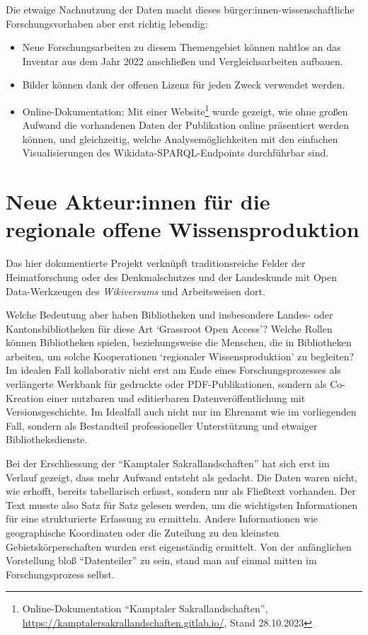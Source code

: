 \documentclass[a4paper,
fontsize=11pt,
oneside,
numbers=noperiodatend,
parskip=half-,
bibliography=totoc,
final
]{scrartcl}
\begin{document}
Die etwaige Nachnutzung der Daten macht dieses
bürger:innen-wissenschaftliche Forschungsvorhaben aber erst richtig
lebendig:

\begin{itemize}
\item
  Neue Forschungsarbeiten zu diesem Themengebiet können nahtlos an das
  Inventar aus dem Jahr 2022 anschließen und Vergleichsarbeiten
  aufbauen.
\item
  Bilder können dank der offenen Lizenz für jeden Zweck verwendet
  werden.
\item
  Online-Dokumentation: Mit einer Website\footnote{Online-Dokumentation
    \enquote{Kamptaler Sakrallandschaften},
    \url{https://kamptalersakrallandschaften.gitlab.io/}, Stand
    28.10.2023} wurde gezeigt, wie ohne großen Aufwand die vorhandenen
  Daten der Publikation online präsentiert werden können, und
  gleichzeitig, welche Analysemöglichkeiten mit den einfachen
  Visualisierungen des Wikidata-SPARQL-Endpoints durchführbar sind.
\end{itemize}

\hypertarget{neue-akteurinnen-fuxfcr-die-regionale-offene-wissensproduktion}{%
\section{Neue Akteur:innen für die regionale offene
Wissensproduktion}\label{neue-akteurinnen-fuxfcr-die-regionale-offene-wissensproduktion}}

Das hier dokumentierte Projekt verknüpft traditionsreiche Felder der
Heimatforschung oder des Denkmalschutzes und der Landeskunde mit Open
Data-Werkzeugen des \emph{Wikiversums} und Arbeitsweisen dort.

Welche Bedeutung aber haben Bibliotheken und insbesondere Landes- oder
Kantonsbibliotheken für diese Art \enquote*{Grassroot Open Access}?
Welche Rollen können Bibliotheken spielen, beziehungsweise die Menschen,
die in Bibliotheken arbeiten, um solche Kooperationen
\enquote*{regionaler Wissensproduktion} zu begleiten? Im idealen Fall
kollaborativ nicht erst am Ende eines Forschungsprozesses als
verlängerte Werkbank für gedruckte oder PDF-Publikationen, sondern als
Co-Kreation einer nutzbaren und editierbaren Datenveröffentlichung mit
Versionsgeschichte. Im Idealfall auch nicht nur im Ehrenamt wie im
vorliegenden Fall, sondern als Bestandteil professioneller Unterstützung
und etwaiger Bibliotheksdienste.

Bei der Erschliessung der \enquote{Kamptaler Sakrallandschaften} hat
sich erst im Verlauf gezeigt, dass mehr Aufwand entsteht als gedacht.
Die Daten waren nicht, wie erhofft, bereits tabellarisch erfasst,
sondern nur als Fließtext vorhanden. Der Text musste also Satz für Satz
gelesen werden, um die wichtigsten Informationen für eine strukturierte
Erfassung zu ermitteln. Andere Informationen wie geographische
Koordinaten oder die Zuteilung zu den kleinsten Gebietskörperschaften
wurden erst eigenständig ermittelt. Von der anfänglichen Vorstellung
bloß \enquote{Datenteiler} zu sein, stand man auf einmal mitten im
Forschungsprozess selbst.
\end{document}
